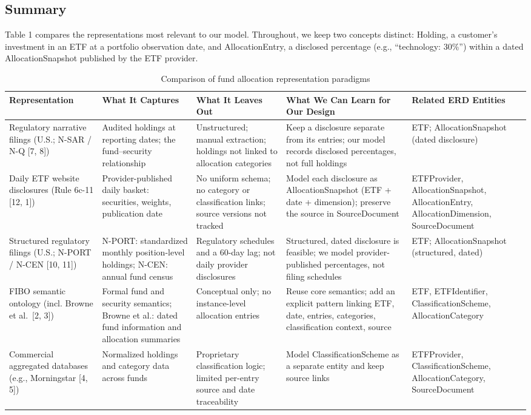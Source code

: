 \documentclass[sigconf]{acmart}
\begin{document}
\subsection{Summary}

Table 1 compares the representations most relevant to our model.
Throughout, we keep two concepts distinct: Holding, a customer's
investment in an ETF at a portfolio observation date, and AllocationEntry,
a disclosed percentage (e.g., ``technology: 30\%'') within a dated
AllocationSnapshot published by the ETF provider.

\begin{table}[!t]
\caption{Comparison of fund allocation representation paradigms}
\label{tab:paradigms}
\setlength{\tabcolsep}{4pt}
\begin{tabular}{p{}p{}p{}p{}p{}}
\toprule
Representation & What It Captures & What It Leaves Out & What We Can Learn for Our Design & Related ERD Entities\\
\midrule
Regulatory narrative filings (U.S.; N-SAR / N-Q [7, 8])
& Audited holdings at reporting dates; the fund--security relationship
& Unstructured; manual extraction; holdings not linked to allocation categories
& Keep a disclosure separate from its entries; our model records disclosed percentages, not full holdings
& ETF; AllocationSnapshot (dated disclosure)\\
Daily ETF website disclosures (Rule 6c-11 [12, 1])
& Provider-published daily basket: securities, weights, publication date
& No uniform schema; no category or classification links; source versions not tracked
& Model each disclosure as AllocationSnapshot (ETF + date + dimension); preserve the source in SourceDocument
& ETFProvider, AllocationSnapshot, AllocationEntry, AllocationDimension, SourceDocument\\
Structured regulatory filings (U.S.; N-PORT / N-CEN [10, 11])
& N-PORT: standardized monthly position-level holdings; N-CEN: annual fund census
& Regulatory schedules and a 60-day lag; not daily provider disclosures
& Structured, dated disclosure is feasible; we model provider-published percentages, not filing schedules
& ETF; AllocationSnapshot (structured, dated)\\
FIBO semantic ontology (incl. Browne et al.\ [2, 3])
& Formal fund and security semantics; Browne et al.: dated fund information and allocation summaries
& Conceptual only; no instance-level allocation entries
& Reuse core semantics; add an explicit pattern linking ETF, date, entries, categories, classification context, source
& ETF, ETFIdentifier, ClassificationScheme, AllocationCategory\\
Commercial aggregated databases (e.g., Morningstar [4, 5])
& Normalized holdings and category data across funds
& Proprietary classification logic; limited per-entry source and date traceability
& Model ClassificationScheme as a separate entity and keep source links
& ETFProvider, ClassificationScheme, AllocationCategory, SourceDocument\\
\bottomrule
\end{tabular}
\end{table}
\end{document}
